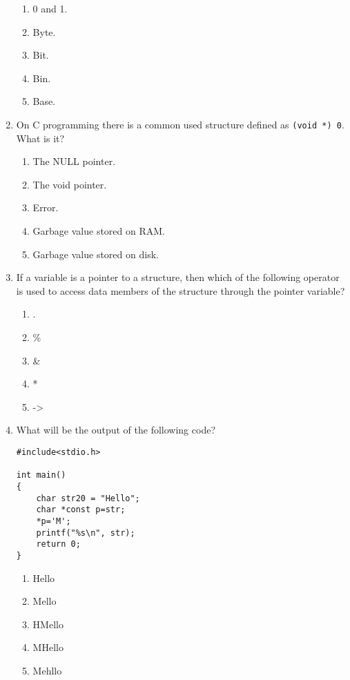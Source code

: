 \documentclass{article}
\begin{document}
\begin{enumerate}
            \begin{enumerate}
                \item 0 and 1.
                \item Byte.
                \item Bit.
                \item Bin.
                \item Base.
            \end{enumerate}
\item On C programming there is a common used structure defined as \texttt{(void *) 0}. What is it?
    
            \begin{enumerate}
                \item The NULL pointer.
                \item The void pointer.
                \item Error.
                \item Garbage value stored on RAM.
                \item Garbage value stored on disk.
            \end{enumerate}
\item If a variable is a pointer to a structure, then which of the following operator is used to access data members of the structure through the pointer variable?
    
            \begin{enumerate}
                \item .
                \item \%
                \item \&
                \item *
                \item ->
            \end{enumerate}
\item What will be the output of the following code?

            \begin{verbatim}
#include<stdio.h>

int main()
{
    char str20 = "Hello";
    char *const p=str;
    *p='M';
    printf("%s\n", str);
    return 0;
}
            \end{verbatim}
    
            \begin{enumerate}
                \item Hello
                \item Mello
                \item HMello
                \item MHello
                \item Mehllo
            \end{enumerate}


\end{enumerate}
\end{document}
